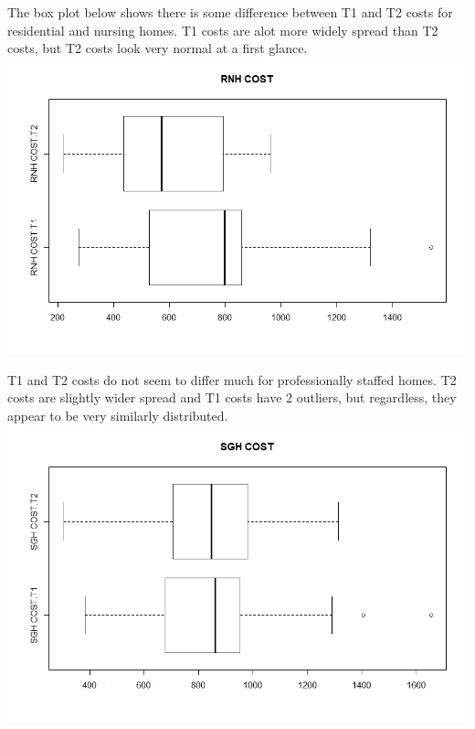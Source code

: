 \documentclass[]{article}
\begin{document}
The box plot below shows there is some difference between T1 and T2 costs for residential and nursing homes. T1 costs are alot more widely spread than T2 costs, but T2 costs look very normal at a first glance.
\centering
\includegraphics[width=\textwidth]{RStudio/jpeg/Box_RNH.jpeg}
\raggedright

T1 and T2 costs do not seem to differ much for professionally staffed homes. T2 costs are slightly wider spread and T1 costs have 2 outliers, but regardless, they appear to be very similarly distributed.
\centering
\includegraphics[width=\textwidth]{RStudio/jpeg/Box_SGH.jpeg}
\raggedright
\end{document}
